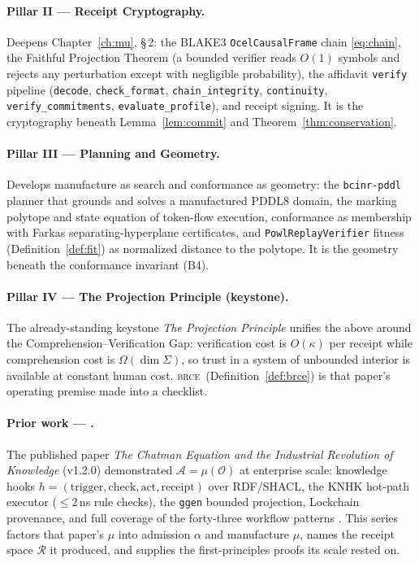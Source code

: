 \documentclass[11pt,oneside]{book}
\theoremstyle{definition}
\theoremstyle{plain}
\theoremstyle{remark}
\newcommand{\Obs}{\mathcal{O}}                 %
\newcommand{\Act}{\mathcal{A}}                 %
\newcommand{\Rec}{\mathcal{R}}                 %
\newcommand{\muop}{\mu}                        %
\newcommand{\adm}{\alpha}                      %
\newcommand{\CL}{\kappa}                       %
\newcommand{\BRCE}{\textsc{brce}}
\newcommand{\code}[1]{\texttt{#1}}
\begin{document}
\paragraph{Pillar II --- Receipt Cryptography.}
Deepens Chapter~\ref{ch:mu}, \S\,2: the BLAKE3 \code{OcelCausalFrame} chain
\eqref{eq:chain}, the Faithful Projection Theorem (a bounded verifier reads $O(1)$ symbols
and rejects any perturbation except with negligible probability), the affidavit
\code{verify} pipeline (\code{decode}, \code{check\_format}, \code{chain\_integrity},
\code{continuity}, \code{verify\_commitments}, \code{evaluate\_profile}), and receipt
signing. It is the cryptography beneath Lemma~\ref{lem:commit} and
Theorem~\ref{thm:conservation}.

\paragraph{Pillar III --- Planning and Geometry.}
Develops manufacture as search and conformance as geometry: the \code{bcinr-pddl} planner
that grounds and solves a manufactured PDDL8 domain, the marking polytope and state equation
of token-flow execution, conformance as membership with Farkas separating-hyperplane
certificates, and \code{PowlReplayVerifier} fitness (Definition~\ref{def:fit}) as normalized
distance to the polytope. It is the geometry beneath the conformance invariant (B4).

\paragraph{Pillar IV --- The Projection Principle (keystone).}
The already-standing keystone \emph{The Projection Principle} unifies the above around the
Comprehension--Verification Gap: verification cost is $O(\CL)$ per receipt while comprehension
cost is $\Omega(\dim\Sigma)$, so trust in a system of unbounded interior is available at
constant human cost. \BRCE\ (Definition~\ref{def:brce}) is that paper's operating premise
made into a checklist.

\paragraph{Prior work --- \cite{chatman2025}.}
The published paper \emph{The Chatman Equation and the Industrial Revolution of Knowledge}
(v1.2.0) demonstrated $\Act=\muop(\Obs)$ at enterprise scale: knowledge hooks
$h=(\text{trigger},\text{check},\text{act},\text{receipt})$ over RDF/SHACL, the KNHK
hot-path executor ($\le 2\,$ns rule checks), the \code{ggen} bounded projection, Lockchain
provenance, and full coverage of the forty-three workflow patterns \cite{vdaalst2003patterns}.
This series factors that paper's $\muop$ into admission $\adm$ and manufacture $\muop$,
names the receipt space $\Rec$ it produced, and supplies the first-principles proofs its
scale rested on.
\end{document}
